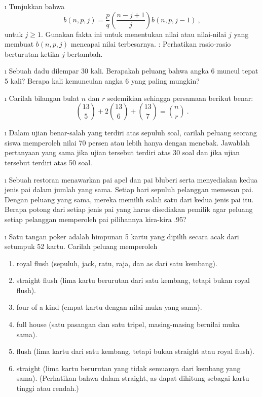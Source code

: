 \begin{LJSItem}
\i\label{exer 3.2.7} Tunjukkan bahwa
$$ b(n,p,j) = \frac pq \left(\frac {n - j + 1}j \right) b(n,p,j - 1)\ ,
$$ untuk $j \ge 1$. Gunakan fakta ini untuk menentukan nilai atau nilai-nilai $j$ yang
membuat $b(n,p,j)$ mencapai nilai terbesarnya.  : Perhatikan rasio-rasio
berturutan ketika $j$ bertambah.

\i\label{exer 3.2.8} Sebuah dadu dilempar 30 kali.  Berapakah peluang bahwa angka 6
muncul tepat 5 kali?  Berapa kali kemunculan angka 6 yang paling mungkin?

\i\label{exer 3.2.9} Carilah bilangan bulat $n$ dan $r$ sedemikian sehingga persamaan
berikut benar:
$$
 {13 \choose 5} + 2{13 \choose 6} + {13 \choose 7} = {n \choose r}\ .
$$

\i\label{exer 3.2.10} Dalam ujian benar-salah yang terdiri atas sepuluh soal, carilah
peluang seorang siswa memperoleh nilai 70 persen atau lebih hanya dengan menebak.
Jawablah pertanyaan yang sama jika ujian tersebut terdiri atas 30 soal dan jika ujian
tersebut terdiri atas 50 soal.

\i\label{exer 3.2.11} Sebuah restoran menawarkan pai apel dan pai bluberi serta
menyediakan kedua jenis pai dalam jumlah yang sama.  Setiap hari sepuluh pelanggan
memesan pai.  Dengan peluang yang sama, mereka memilih salah satu dari kedua jenis pai
itu.  Berapa potong dari setiap jenis pai yang harus disediakan pemilik agar peluang
setiap pelanggan memperoleh pai pilihannya kira-kira .95?

\i\label{exer 3.2.12} Satu tangan poker adalah himpunan 5 kartu yang dipilih secara
acak dari setumpuk 52 kartu.  Carilah peluang memperoleh

\begin{enumerate}
\item royal flush (sepuluh, jack, ratu, raja, dan as dari satu kembang).

\item straight flush (lima kartu berurutan dari satu kembang, tetapi bukan royal flush).

\item four of a kind (empat kartu dengan nilai muka yang sama).

\item full house (satu pasangan dan satu tripel, masing-masing bernilai muka sama).

\item flush (lima kartu dari satu kembang, tetapi bukan straight atau royal flush).

\item straight (lima kartu berurutan yang tidak semuanya dari kembang yang sama).
(Perhatikan bahwa dalam straight, as dapat dihitung sebagai kartu tinggi atau rendah.)
\end{enumerate}


\end{LJSItem}
